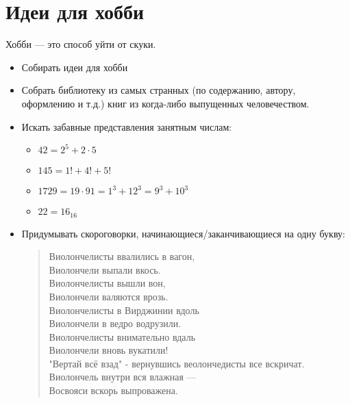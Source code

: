 \section{Идеи для хобби}
Хобби --- это способ уйти от скуки.
\begin{itemize}
\item Собирать идеи для хобби
\item Собрать библиотеку из самых странных (по содержанию, автору, оформлению и т.д.) книг из когда-либо выпущенных человечеством.
\item Искать забавные представления занятным числам:
  \begin{itemize}
    \item  $42 = 2^5 + 2 \cdot 5$
    \item  $145 = 1! + 4! + 5!$
    \item  $1729 = 19 \cdot 91 = 1^3 + 12^3 = 9^3 + 10^3$
    \item  $22 = 16_{16}$
  \end{itemize}
\item Придумывать скороговорки, начинающиеся/заканчивающиеся на одну букву:
\begin{flushleft}
\begin{verse}
Виолончелисты ввалились в вагон,\\
Виолончели выпали вкось.\\
Виолончелисты вышли вон,\\
Виолончели валяются врозь.\\

Виолончелисты в Вирджинии вдоль\\
Виолончели в ведро водрузили.\\
Виолончелисты внимательно вдаль\\
Виолончели вновь вукатили!\\

"Вертай всё взад" - вернувшись веолончедисты все вскричат.\\
Виолончель внутри вся влажная ---\\
Восвояси вскорь выпроважена.
\end{verse}
\end{flushleft}
\end{itemize}

